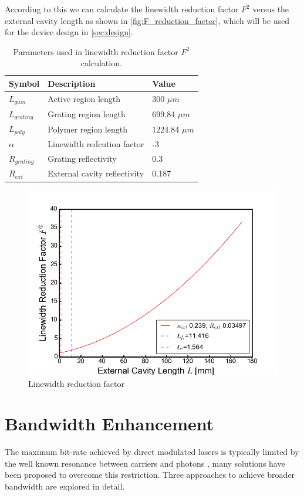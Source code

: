 According to this we can calculate the linewidth reduction factor $F^2$ versus the external cavity length as shown in \autoref{fig:F_reduction_factor}, which will be used for the device design in \autoref{sec:design}. 

\begin{table}[ht]
    \centering
    \begin{tabular}{@{}lll@{}}
    \toprule
    Symbol        & Description                  & Value           \\ \midrule
    $L_{gain}$    & Active region length         & 300 $\mu m$     \\
    $L_{grating}$ & Grating region length        & 699.84 $\mu m$  \\
    $L_{poly}$    & Polymer region length        & 1224.84 $\mu m$ \\
    $\alpha$      & Linewidth redcution factor   & -3              \\
    $R_{grating}$ & Grating reflectivity         & 0.3             \\
    $R_{ext}$     & External cavity reflectivity & 0.187           \\ \bottomrule
    \end{tabular}
    \caption{Parameters used in linewidth reduction factor $F^2$ calculation.}
    \label{tab:F_reduction_factor}
\end{table}

\begin{figure}[ht]
    \centering
    \includegraphics[width=.7\linewidth]{figures/F_reduction_factor.png}
    \caption{Linewidth reduction factor}
    \label{fig:F_reduction_factor}
\end{figure}

\section{Bandwidth Enhancement}\label{sec:bandwidth_enhancement}
The maximum bit-rate achieved by direct modulated lasers is typically limited by the well known resonance between carriers and photons \cite{coldren2012diode}, many solutions have been proposed to overcome this restriction. Three approaches to achieve broader bandwidth are explored in detail. 

